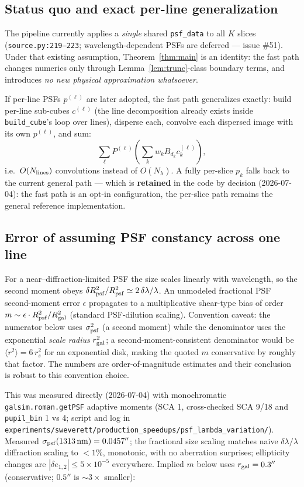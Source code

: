 \documentclass[11pt]{article}
\newcommand{\code}[1]{\texttt{#1}}
\begin{document}
\subsection{Status quo and exact per-line generalization}
The pipeline currently applies a \emph{single} shared \code{psf\_data} to all
$K$ slices (\code{source.py:219--223}; wavelength-dependent PSFs are deferred
--- issue \#51). Under that existing assumption, Theorem~\ref{thm:main} is an
identity: the fast path changes numerics only through
Lemma~\ref{lem:trunc}-class boundary terms, and introduces \emph{no new
physical approximation whatsoever}.

If per-line PSFs $p^{(\ell)}$ are later adopted, the fast path generalizes
exactly: build per-line sub-cubes $c^{(\ell)}$ (the line decomposition
already exists inside \code{build\_cube}'s loop over lines), disperse each,
convolve each dispersed image with its own $p^{(\ell)}$, and sum:
\[
\sum_\ell P^{(\ell)}\!\left( \sum_k w_k B_{d_k} c^{(\ell)}_k \right),
\]
i.e.\ $O(N_{\rm lines})$ convolutions instead of $O(N_\lambda)$. A fully
per-slice $p_k$ falls back to the current general path --- which is
\textbf{retained} in the code by decision (2026-07-04): the fast path is an
opt-in configuration, the per-slice path remains the general reference
implementation.

\subsection{Error of assuming PSF constancy across one line}
\label{sec:lambdaerr}

For a near--diffraction-limited PSF the size scales linearly with wavelength,
so the second moment obeys
$\delta R^2_{\rm psf} / R^2_{\rm psf} \simeq 2\,\delta\lambda/\lambda$.
An unmodeled fractional PSF second-moment error $\epsilon$ propagates to a
multiplicative shear-type bias of order
$m \sim \epsilon \cdot R^2_{\rm psf}/R^2_{\rm gal}$
(standard PSF-dilution scaling). Convention caveat: the numerator below
uses $\sigma_{\rm psf}^2$ (a second moment) while the denominator uses the
exponential \emph{scale radius} $r_{\rm gal}^2$; a second-moment-consistent
denominator would be $\langle r^2 \rangle = 6\,r_s^2$ for an exponential
disk, making the quoted $m$ conservative by roughly that factor. The
numbers are order-of-magnitude estimates and their conclusion is robust to
this convention choice.

This was measured directly (2026-07-04) with monochromatic
\code{galsim.roman.getPSF} adaptive moments (SCA 1, cross-checked SCA 9/18
and \code{pupil\_bin} 1 vs 4; script and log in
\code{experiments/sweverett/production\_speedups/psf\_lambda\_variation/}).
Measured $\sigma_{\rm psf}(1313\,{\rm nm}) = 0.0457''$; the fractional size
scaling matches naive $\delta\lambda/\lambda$ diffraction scaling to
$<1\%$, monotonic, with no aberration surprises; ellipticity changes are
$|\delta e_{1,2}| \le 5\times10^{-5}$ everywhere. Implied $m$ below uses
$r_{\rm gal} = 0.3''$ (conservative; $0.5''$ is $\sim3\times$ smaller):
\end{document}
